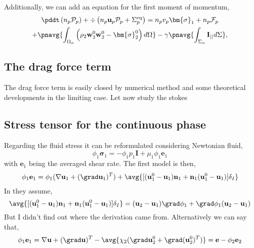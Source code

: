 Additionally, we can add an equation for the first moment of momentum, 
\begin{multline}
    \pddt \left(n_p \mathcal{P}_p\right)
    + \div \left(
        n_p \textbf{u}_p \mathcal{P}_p
    + \Sigma_p^\text{eq}
    \right)
    =
    n_p v_p \bm{\sigma}_1 
    + n_p \mathcal{F}_p\\
    +\pnavg{\int_{\Omega_\alpha} \left(
        \rho_2 \textbf{w}_2^0  \textbf{w}_2^0 
        - \bm{\sigma}_2^0
        \right) d\Omega}
        - \gamma  \pnavg{\int_{\Sigma_\alpha} \textbf{I}_{||} d\Sigma},
\end{multline}

\subsection*{The drag force term}

The drag force term is easily closed by numerical method and some theoretical developments in the limiting case. 
Let now study the stokes 

\subsection*{Stress tensor for the continuous phase }
Regarding the fluid stress it can be reformulated considering Newtonian fluid,
\begin{equation}
    \phi_1 \bm{\sigma}_1 
    = - \phi_1 p_1 \textbf{I}
    + \mu_1 \phi_1 \textbf{e}_1
\end{equation}
with $\textbf{e}_1$ being the averaged shear rate. 
The first model is then, 
\begin{align*}
    \phi_1 \textbf{e}_1
    = \phi_1 (\nabla \textbf{u}_1+ (\grad \textbf{u}_1)^T)
    + \avg{[(\textbf{u}_1^0 - \textbf{u}_1)  \textbf{n}_1 +  \textbf{n}_1(\textbf{u}_1^0 - \textbf{u}_1 )]\delta_I}
\end{align*}
In \citet[chap 9]{ishii1975thermo} they assume,
\begin{equation}
    \avg{[(\textbf{u}_1^0 - \textbf{u}_1)  \textbf{n}_1 +  \textbf{n}_1(\textbf{u}_1^0 - \textbf{u}_1 )]\delta_I}\\
    = 
    (\textbf{u}_2 - \textbf{u}_1)  \grad \phi_1 +  \grad \phi_1(\textbf{u}_2 - \textbf{u}_1 )\\
\end{equation}
But I didn't find out where the derivation came from. 
Alternatively we can say that, 
\begin{align*}
    \phi_1 \textbf{e}_1
    = \nabla \textbf{u}+ (\grad \textbf{u})^T
    - \avg{\chi_2 (\grad\textbf{u}_2^0 + \grad(\textbf{u}_2^0 )^T)}
    = \textbf{e}
    - \phi_2 \textbf{e}_2
\end{align*}

